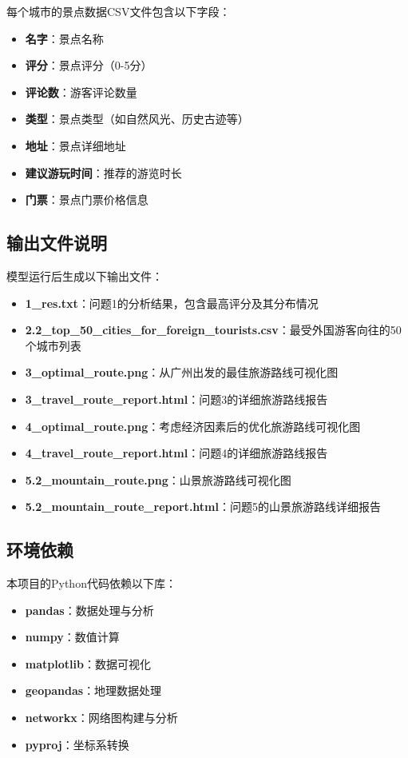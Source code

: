 \documentclass[withoutpreface,bwprint]{cumcmthesis} %
\begin{document}
\begin{appendices}
每个城市的景点数据CSV文件包含以下字段：
\begin{itemize}
    \item \textbf{名字}：景点名称
    \item \textbf{评分}：景点评分（0-5分）
    \item \textbf{评论数}：游客评论数量
    \item \textbf{类型}：景点类型（如自然风光、历史古迹等）
    \item \textbf{地址}：景点详细地址
    \item \textbf{建议游玩时间}：推荐的游览时长
    \item \textbf{门票}：景点门票价格信息
\end{itemize}

\subsection{输出文件说明}

模型运行后生成以下输出文件：
\begin{itemize}
    \item \textbf{1\_res.txt}：问题1的分析结果，包含最高评分及其分布情况
    \item \textbf{2.2\_top\_50\_cities\_for\_foreign\_tourists.csv}：最受外国游客向往的50个城市列表
    \item \textbf{3\_optimal\_route.png}：从广州出发的最佳旅游路线可视化图
    \item \textbf{3\_travel\_route\_report.html}：问题3的详细旅游路线报告
    \item \textbf{4\_optimal\_route.png}：考虑经济因素后的优化旅游路线可视化图
    \item \textbf{4\_travel\_route\_report.html}：问题4的详细旅游路线报告
    \item \textbf{5.2\_mountain\_route.png}：山景旅游路线可视化图
    \item \textbf{5.2\_mountain\_route\_report.html}：问题5的山景旅游路线详细报告
\end{itemize}

\subsection{环境依赖}

本项目的Python代码依赖以下库：
\begin{itemize}
    \item \textbf{pandas}：数据处理与分析
    \item \textbf{numpy}：数值计算
    \item \textbf{matplotlib}：数据可视化
    \item \textbf{geopandas}：地理数据处理
    \item \textbf{networkx}：网络图构建与分析
    \item \textbf{pyproj}：坐标系转换
\end{itemize}





\end{appendices}
\end{document}
